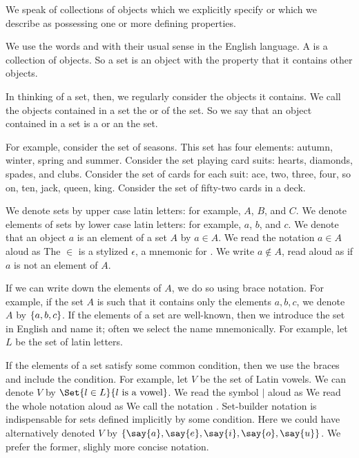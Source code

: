 
\sbasic



\sstart



We speak of collections of objects
which we explicitly specify or which
we describe as possessing one or more
defining properties.



We use the words 
and 
with their usual sense in the English
language.
A  is a collection
of objects.
So a set is an object with
the property that it
contains other objects.

In thinking of a set, then,
we regularly consider the
objects it contains.
We call the objects contained
in a set the
 or
 of the set.
So we say that an object
contained in a set is a
 or an
 the set.

For example, consider the set of
seasons. This set has four elements:
autumn, winter, spring and summer.
Consider the set playing card suits:
hearts, diamonds, spades, and clubs.
Consider the set of cards for each suit:
ace, two, three, four, so on, ten, jack, queen,
king.
Consider the set of fifty-two cards in a deck.


We denote sets by upper case
latin letters: for example,
$A$, $B$, and $C$.
We denote elements of sets
by lower case latin letters:
for example, $a$, $b$, and $c$.
We denote that an object $a$
is an element of a set $A$
by $a \in A$.
We read the notation
$a \in A$ aloud as 
The $\in$ is a stylized $\epsilon$,
a mnemonic for .
We write $a \not\in A$, read aloud
as  if $a$ is not
an element of $A$.

If we can write down the elements
of $A$, we do so using brace notation.
For example, if the set $A$ is such
that it contains only the elements
$a, b, c$, we denote $A$ by
$\{a, b, c\}$.
If the elements of a set are well-known,
then we introduce the set in English
and name it; often we select the name mnemonically.
For example, let $L$ be the set of latin letters.

If the elements of a set satisfy
some common condition, then we use
the braces and include the condition.
For example, let $V$ be the set of
Latin vowels.
We can denote $V$ by
$\Set{l \in L}{l \text{ is a vowel}}$.
We read the symbol $\mid$ aloud as
We read the whole notation aloud as
We call the notation
.
Set-builder notation is indispensable for
sets defined implicitly by some condition.
Here we could have alternatively denoted
$V$ by
$\set{\say{a},\say{e},\say{i},\say{o},\say{u}}$.
We prefer the former, slighly more concise notation.

\strats

